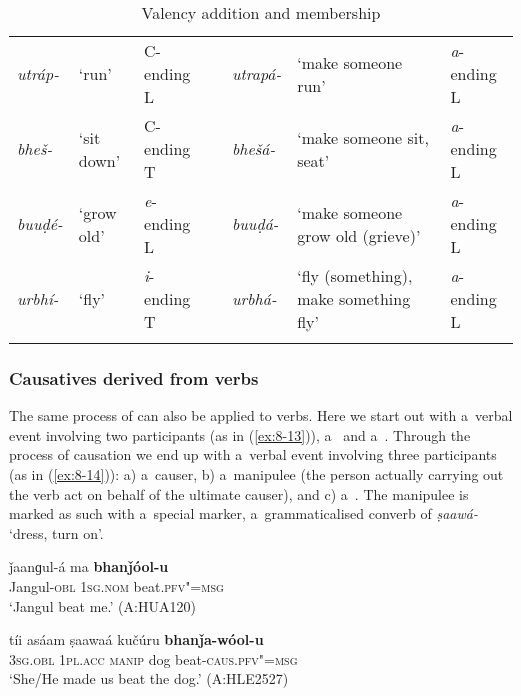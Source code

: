 \begin{table} 
\caption{Valency addition and  membership}
\begin{tabularx}{\textwidth}{ l  P{10mm}  l  l  l  Q  l }
\lsptoprule
\textit{utráp-} &
`run' &
C-ending L &
\centering {\textgreater} &
\textit{utrapá-} &
`make someone run' &
\textit{a}-ending L\\
\textit{bheš-} &
`sit down' &
C-ending T &
\centering {\textgreater} &
\textit{bhešá-} &
`make someone sit, seat' &
\textit{a}-ending L\\
\textit{buuḍé-} &
`grow old' &
\textit{e}-ending L &
\centering {\textgreater}\par
&
\textit{buuḍá-} &
`make someone grow old (grieve)' &
\textit{a}-ending L\\
\textit{urbhí-} &
`fly'
&
{\textit{i}-ending T}
&
\centering {\textgreater}\par
&
\textit{urbhá-}
&
`fly (something), make something fly' &
{\textit{a}-ending L}
\\\lspbottomrule
\end{tabularx}
\label{tab:8-addcl}
\end{table}

\subsubsection*{Causatives derived from  verbs}

The same process of  can also be applied to  verbs. Here we start out with a~verbal event involving two participants (as in (\ref{ex:8-13})), a~ and a~. Through the process of causation we end up with a~verbal event involving three participants (as in (\ref{ex:8-14})): a) a~causer, b) a~manipulee (the person actually carrying out the verb act on behalf of the ultimate causer), and c) a~. The manipulee is marked as such with a~special marker, a~grammaticalised converb of \textit{ṣaawá-} `dress, turn on'. 


\begin{exe}
\ex
\label{ex:8-13}
\gll ǰaanɡul-á ma \textbf{bhanǰóol-u} \\
Jangul-\textsc{obl} \textsc{1sg.nom} beat.\textsc{pfv"=msg} \\
\glt `Jangul beat me.' (A:HUA120)
\end{exe}
\begin{exe}
\ex
\label{ex:8-14}
\gll tíi asáam ṣaawaá kučúru \textbf{bhanǰa-wóol-u} \\
\textsc{3sg.obl} \textsc{1pl.acc} \textsc{manip} dog beat-\textsc{caus.pfv"=msg} \\
\glt `She/He made us beat the dog.' (A:HLE2527)
\end{exe}


